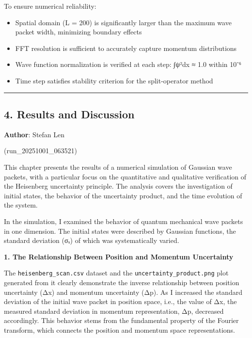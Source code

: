 \documentclass[
  11pt,
]{article}
\providecommand{\tightlist}{%
  \setlength{\itemsep}{0pt}\setlength{\parskip}{0pt}}
\begin{document}
To ensure numerical reliability:

\begin{itemize}
\tightlist
\item
  Spatial domain (L = 200) is significantly larger than the maximum wave
  packet width, minimizing boundary effects
\item
  FFT resolution is sufficient to accurately capture momentum
  distributions
\item
  Wave function normalization is verified at each step:
  ∫\textbar ψ\textbar²dx ≈ 1.0 within 10⁻⁶
\item
  Time step satisfies stability criterion for the split-operator method
\end{itemize}

\begin{center}\rule{0.5\linewidth}{0.5pt}\end{center}

\subsection{4. Results and Discussion}\label{results-and-discussion}

\textbf{Author}: Stefan Len

(run\_20251001\_063521)

This chapter presents the results of a numerical simulation of Gaussian
wave packets, with a particular focus on the quantitative and
qualitative verification of the Heisenberg uncertainty principle. The
analysis covers the investigation of initial states, the behavior of the
uncertainty product, and the time evolution of the system.

In the simulation, I examined the behavior of quantum mechanical wave
packets in one dimension. The initial states were described by Gaussian
functions, the standard deviation (σₓ) of which was systematically
varied.

\textbf{1. The Relationship Between Position and Momentum Uncertainty}

The \texttt{heisenberg\_scan.csv} dataset and the
\texttt{uncertainty\_product.png} plot generated from it clearly
demonstrate the inverse relationship between position uncertainty (Δx)
and momentum uncertainty (Δp). As I increased the standard deviation of
the initial wave packet in position space, i.e., the value of Δx, the
measured standard deviation in momentum representation, Δp, decreased
accordingly. This behavior stems from the fundamental property of the
Fourier transform, which connects the position and momentum space
representations.
\end{document}
